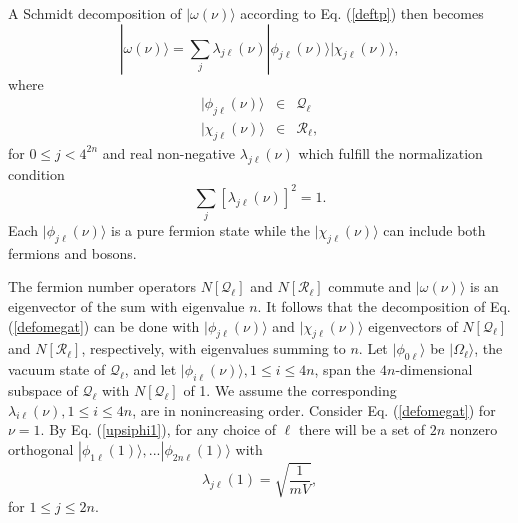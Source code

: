 \documentclass[12pt,amsmath,amssymb,onecolumn]{revtex4-2}
\begin{document}
A Schmidt decomposition of $|\omega(\nu) \rangle $ according to
Eq. (\ref{deftp}) then becomes
\begin{equation}
\label{defomegat}
|\omega(\nu) \rangle  =  \sum_j \lambda_{j\ell}(\nu) 
|\phi_{j\ell}(\nu) \rangle |\chi_{j\ell}(\nu) \rangle ,
\end{equation}
where 
\begin{subequations}
\begin{eqnarray}
\label{defphit2}
|\phi_{j\ell}(\nu) \rangle  & \in & \mathcal{Q}_\ell \\
\label{defchit}
|\chi_{j\ell}( \nu) \rangle  & \in & \mathcal{R}_\ell,
\end{eqnarray}
\end{subequations}
for $0 \leq j < 4^{2n}$ and real non-negative $\lambda_{j\ell}( \nu)$ which
fulfill the normalization condition
\begin{equation}
\label{normalization}
\sum_j [ \lambda_{j\ell}( \nu)]^2 =  1.
\end{equation}
Each $|\phi_{j\ell}(\nu) \rangle $ is a pure fermion state while
the $|\chi_{j\ell}(\nu) \rangle $ can include both fermions and bosons.


The fermion number operators $N[\mathcal{Q}_\ell]$ and $N[\mathcal{R}_\ell]$ commute and
$|\omega(\nu) \rangle $ is an eigenvector of the sum with eigenvalue $n$. It follows that 
the decomposition of Eq. (\ref{defomegat}) can be done with $|\phi_{j\ell}( \nu) \rangle $ 
and $|\chi_{j\ell}(\nu) \rangle $
eigenvectors of $N[\mathcal{Q}_\ell]$ and $N[\mathcal{R}_\ell]$, respectively, with
eigenvalues summing to $n$. Let $|\phi_{0\ell} \rangle $ be $|\Omega_\ell \rangle $, the vacuum state
of $\mathcal{Q}_\ell$, and let 
$|\phi_{i\ell} (\nu) \rangle , 1 \le i \le 4n$, 
span the $4n$-dimensional subspace of $\mathcal{Q}_\ell$
with $N[\mathcal{Q}_\ell]$ of 1. 
We assume the corresponding $\lambda_{i\ell}( \nu), 1 \le i \le 4n$,
are in nonincreasing order.
Consider Eq. (\ref{defomegat}) for $\nu = 1$. By Eq. (\ref{upsiphi1}), for any choice
of $\ell$ there will be a set of $2n$ nonzero orthogonal
$|\phi_{1\ell}( 1) \rangle , ... |\phi_{2n\ell}( 1) \rangle $ with 
\begin{equation}
\label{lambda1}
\lambda_{j\ell}( 1) = \sqrt{\frac{1}{mV}},
\end{equation}
for $1 \le j \le 2n$. 
\end{document}
